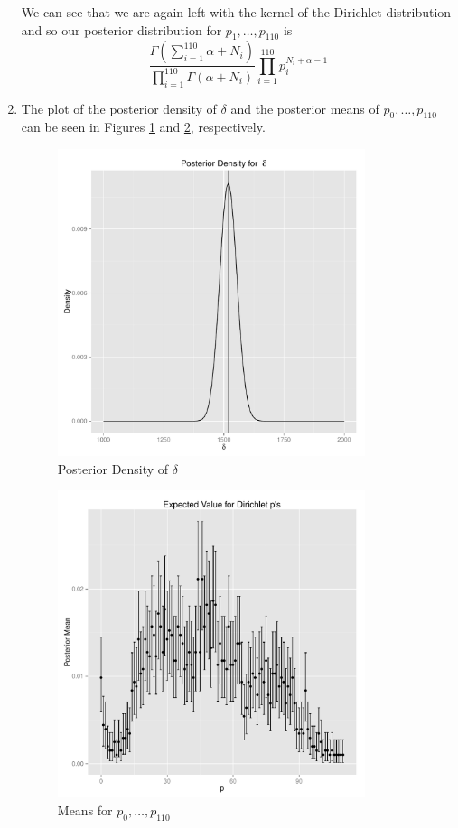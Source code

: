 \documentclass[12pt, oneside]{article}
\begin{document}
\begin{enumerate}
  We can see that we are again left with the kernel of the Dirichlet distribution 
  and so our posterior distribution for
  $p_1, \dots, p_{110}$ is 
  $$ \frac{\Gamma\left(\sum_{i=1}^{110}\alpha+N_i\right)}{\prod_{i=1}^{110}\Gamma\left(\alpha+N_i\right)} 
  \prod_{i=1}^{110}p_i^{N_i+\alpha-1} $$

\item The plot of the posterior density of $\delta$ and the posterior means of $p_0, \dots, p_{110}$ can be seen in Figures \ref{delta} and \ref{dirichlet}, respectively.
  \begin{figure}
    \centering
    \includegraphics[width=0.85\textwidth]{delta.pdf}
    \caption{Posterior Density of $\delta$}
    \label{delta}
  \end{figure}
  \begin{figure}
    \centering
    \includegraphics[width=0.85\textwidth]{dirichlet.pdf}
    \caption{Means for $p_0, \dots, p_{110}$}
    \label{dirichlet}
  \end{figure}

\end{enumerate}
\end{document}
